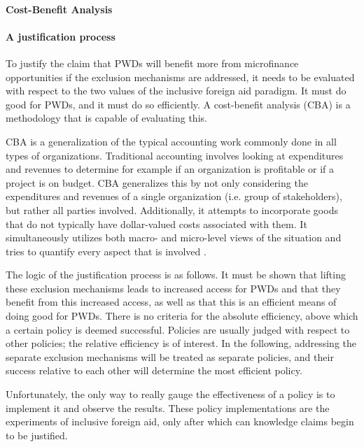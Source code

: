 \documentclass[a4paper]{article}
\begin{document}
\paragraph{Cost-Benefit Analysis} 
\paragraph{A justification process} 

To justify the claim that PWDs will benefit more from microfinance
opportunities if the exclusion mechanisms are addressed, it needs to be
evaluated with respect to the two values of the inclusive foreign aid
paradigm. It must do good for PWDs, and it must do so efficiently. A
cost-benefit analysis (CBA) is a methodology that is capable of evaluating
this.

CBA is a generalization of the typical accounting work commonly done in all
types of organizations. Traditional accounting involves looking at
expenditures and revenues to determine for example if an organization is
profitable or if a project is on budget. CBA generalizes this by not only
considering the expenditures and revenues of a single organization (i.e. group
of stakeholders), but rather all parties involved.  Additionally, it attempts
to incorporate goods that do not typically have dollar-valued costs associated
with them. It simultaneously utilizes both macro- and micro-level views of the
situation and tries to quantify every aspect that is involved
\cite{mishan2015elements}.

The logic of the justification process is as follows. It must be shown that
lifting these exclusion mechanisms leads to increased access for PWDs and that
they benefit from this increased access, as well as that this is an efficient
means of doing good for PWDs. There is no criteria for the absolute
efficiency, above which a certain policy is deemed successful. Policies are
usually judged with respect to other policies; the relative efficiency is of
interest. In the following, addressing the separate exclusion mechanisms will
be treated as separate policies, and their success relative to each other will
determine the most efficient policy.

Unfortunately, the only way to really gauge the effectiveness of a policy is
to implement it and observe the results. These policy implementations are the
experiments of inclusive foreign aid, only after which can knowledge claims
begin to be justified.
\end{document}
